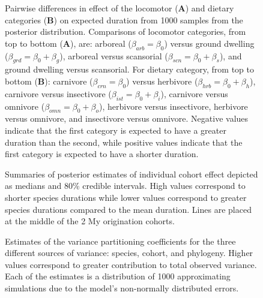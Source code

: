 \documentclass{pnastwo}
\begin{document}
\begin{figure}[ht]
  \centering
  \caption{Pairwise differences in effect of the locomotor (\textbf{A}) and dietary categories (\textbf{B}) on expected duration from 1000 samples from the posterior distribution. Comparisons of locomotor categories, from top to bottom (\textbf{A}), are: arboreal (\(\beta_{arb} = \beta_{0}\)) versus ground dwelling (\(\beta_{grd} = \beta_{0} + \beta_{g}\)), arboreal versus scansorial (\(\beta_{scn} = \beta_{0} + \beta_{s}\)), and ground dwelling versus scansorial. For dietary category, from top to bottom (\textbf{B}): carnivore (\(\beta_{crn} = \beta_{0}\)) versus herbivore (\(\beta_{hrb} = \beta_{0} + \beta_{h}\)), carnivore versus insectivore (\(\beta_{ist} = \beta_{0} + \beta_{i}\)), carnivore versus omnivore (\(\beta_{omn} = \beta_{0} + \beta_{o}\)), herbivore versus insectivore, herbivore versus omnivore, and insectivore versus omnivore. Negative values indicate that the first category is expected to have a greater duration than the second, while positive values indicate that the first category is expected to have a shorter duration.}
  \label{fig:trait_est}
\end{figure}

\begin{figure}[ht]
  \centering
  \caption{Summaries of posterior estimates of individual cohort effect depicted as medians and 80\% credible intervals. High values correspond to shorter species durations while lower values correspond to greater species durations compared to the mean duration. Lines are placed at the middle of the 2 My origination cohorts.}
  \label{fig:eff_cohort}
\end{figure}

\begin{figure}[ht]
  \centering
  \caption{Estimates of the variance partitioning coefficients for the three different sources of variance: species, cohort, and phylogeny. Higher values correspond to greater contribution to total observed variance. Each of the estimates is a distribution of 1000 approximating simulations due to the model's non-normally distributed errors.}
  \label{fig:vpc}
\end{figure}
\end{document}

